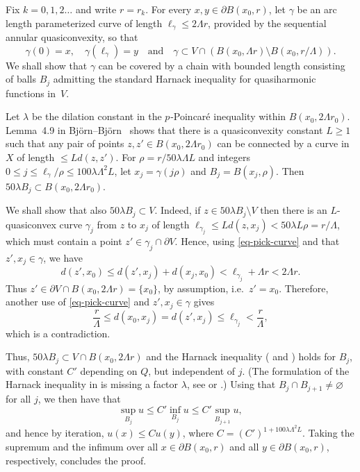\documentclass[a4paper,twoside]{article}
\makeatletter
\theoremstyle{propositional}
\theoremstyle{descriptive}
\theoremstyle{remarkstyle}
\renewenvironment{proof}[1][\proofname]{\par
  \pushQED{\qed}%
  \normalfont
  \trivlist
  \item[\hskip\labelsep
        \itshape
    #1\@addpunct{.}]\ignorespaces
}{%
  \popQED\endtrivlist\@endpefalse
}
\newcommand{\setm}{\setminus}
\renewcommand{\emptyset}{\varnothing}
\newcommand{\bdry}{\partial}
\newcommand{\bdy}{\bdry}
\newcommand{\ga}{\gamma}
\newcommand{\la}{\lambda}
\newcommand{\La}{\Lambda}
\newcommand{\p}{{$p\mspace{1mu}$}}
\numberwithin{equation}{section}
\makeatother
\begin{document}
\begin{proof}
Fix $k=0,1,2\dots$ and write $r=r_k$.
For every $x,y\in \bdy B(x_0,r)$, let $\ga$ be an arc length parameterized
curve of length $\ell_\ga \le 2\La r$, 
provided 
by the sequential annular quasiconvexity, so that 
\begin{equation}   \label{eq-pick-curve}
\ga(0)=x, \quad \ga(\ell_\ga)=y \quad \text{and} \quad
\ga \subset V \cap (B(x_0,\La r) \setm B(x_0,r/\La)).
\end{equation}
We shall show that $\ga$ can be covered by 
a chain with bounded length consisting of balls $B_j$ 
admitting the standard Harnack inequality
for quasiharmonic functions in~$V$.


Let $\la$ be the dilation constant in the \p-Poincar\'e inequality
within $B(x_0,2 \La r_0)$.
Lemma~4.9 in Bj\"orn--Bj\"orn~\cite{BBsemilocal} shows that
there is a quasiconvexity constant  $L \ge 1$
such that any pair of points $z,z'\in B(x_0,2 \La r_0)$ can be connected by a 
curve 
in $X$ of length $ \le Ld(z,z')$.
For $\rho=r/50\la \La L$  and integers 
$0\le j \le \ell_\ga/\rho \le 100\la \La^2 L$,
let $x_j=\ga(j\rho)$ and $B_j=B(x_j,\rho)$.
Then $50 \la B_j  \subset B(x_0,2 \La r_0)$.


We shall show that also $50 \la B_j  \subset V$.
Indeed, if $z\in 50 \la B_j \setm V$ then 
there is an $L$-quasiconvex curve $\ga_j$  
from $z$ to $x_j$ of length $\ell_{\ga_j}   \le Ld(z,x_j) < 50\la L\rho =r/\La$,
which must contain a point $z' \in \ga_j   \cap \bdy V$.
Hence, using \eqref{eq-pick-curve} and that $z',x_j\in\ga$,
we have
\[
   d(z',x_0) 
 \le d(z',x_j)+d(x_j,x_0) 
  < \ell_{\ga_j} +\La r
< 2 \La r.
\]
Thus $z' \in \bdy V \cap B(x_0,2\La r) = \{x_0\}$,
by assumption,  i.e.\ $z'=x_0$.
Therefore, another use of \eqref{eq-pick-curve} and $z',x_j\in\ga$
gives
\[
\frac{r}{\La} \le d(x_0,x_j)  
= d(z',x_j)
\le \ell_{\ga_j} < \frac{r}{\La},
\]
which is a contradiction. 

Thus, $50 \la B_j \subset V \cap B(x_0,2\La r)$ and the Harnack inequality 
(\cite[Corollary~7.3]{KiSh01} and \cite[p.~190]{BBsemilocal}) 
holds for $B_j$,
with constant $C'$ depending on $Q$, but independent of $j$.
(The formulation of the Harnack inequality in \cite{KiSh01} is missing 
a factor $\la$,
see \cite[Section~10]{BMarola} or \cite[Section~8.4]{BBbook}.)
Using that $B_j\cap B_{j+1}\ne\emptyset$ for all $j$,
we then have that
\[
\sup_{B_j} u \le C' \inf_{B_j} u \le C' \sup_{B_{j+1}} u,
\]
and hence by iteration, $u(x) \le C u(y)$,
where $C=(C')^{1+100\la \La^2 L}$.
Taking the supremum and the infimum over all $x\in \bdy B(x_0,r)$ and
all $y\in \bdy B(x_0,r)$, respectively, concludes the proof.
\end{proof}
\end{document}
